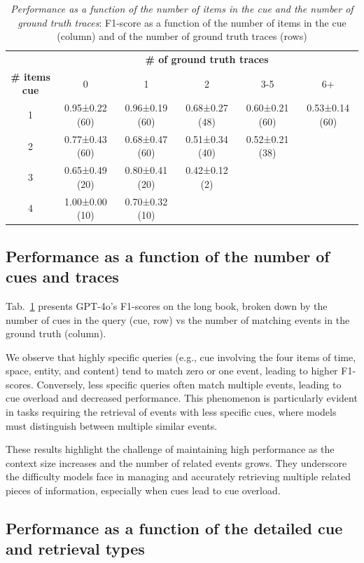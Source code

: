 \documentclass{article}
\begin{document}
\begin{table}[!t]
\centering
\caption{\textit{Performance as a function of the number of items in the cue and the number of ground truth traces}: F1-score as a function of the number of items in the cue (column) and of the number of ground truth traces (rows)}
\label{tab:result_cue_bin}
\small{
\begin{tabular}{@{}cccccc@{}}
\toprule
& \multicolumn{5}{c}{\bf \# of ground truth traces} \\
\textbf{\# items cue} & 0 & 1 & 2 & 3-5 & 6+ \\ \midrule
1 & 0.95±0.22 (60) & 0.96±0.19 (60) & 0.68±0.27 (48) & 0.60±0.21 (60) & 0.53±0.14 (60)\\
2 & 0.77±0.43 (60) & 0.68±0.47 (60) & 0.51±0.34 (40) & 0.52±0.21 (38) & \\
3 & 0.65±0.49 (20) & 0.80±0.41 (20) & 0.42±0.12 (2) & & \\
4 & 1.00±0.00 (10) & 0.70±0.32 (10) & & & \\ \bottomrule
\end{tabular}
}
\end{table}

 
\subsection{Performance as a function of the number of cues and traces}
\label{app:eval:number_cues}
Tab.~\ref{tab:result_cue_bin} presents GPT-4o's F1-scores on the long book, broken down by the number of cues in the query (cue, row) vs the number of matching events in the ground truth (column).


We observe that highly specific queries (e.g., cue involving the four items of time, space, entity, and content) tend to match zero or one event, leading to higher F1-scores. Conversely, less specific queries often match multiple events, leading to cue overload and decreased performance. This phenomenon is particularly evident in tasks requiring the retrieval of events with less specific cues, where models must distinguish between multiple similar events.

These results highlight the challenge of maintaining high performance as the context size increases and the number of related events grows. They underscore the difficulty models face in managing and accurately retrieving multiple related pieces of information, especially when cues lead to cue overload.

\subsection{Performance as a function of the detailed cue and retrieval types}
\end{document}
